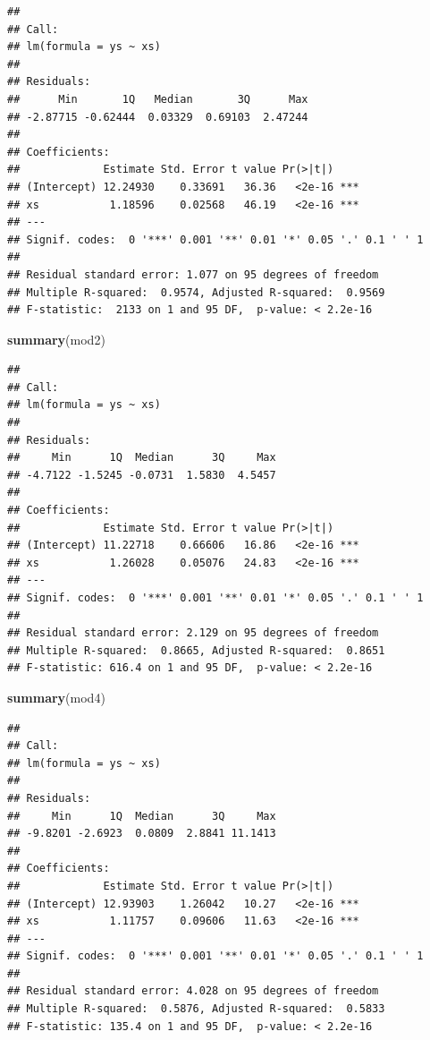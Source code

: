 \documentclass[
]{book}
\newenvironment{Shaded}{\begin{snugshade}}{\end{snugshade}}
\newcommand{\KeywordTok}[1]{\textcolor[rgb]{0.13,0.29,0.53}{\textbf{#1}}}
\newcommand{\NormalTok}[1]{#1}
\begin{document}
\begin{verbatim}
## 
## Call:
## lm(formula = ys ~ xs)
## 
## Residuals:
##      Min       1Q   Median       3Q      Max 
## -2.87715 -0.62444  0.03329  0.69103  2.47244 
## 
## Coefficients:
##             Estimate Std. Error t value Pr(>|t|)    
## (Intercept) 12.24930    0.33691   36.36   <2e-16 ***
## xs           1.18596    0.02568   46.19   <2e-16 ***
## ---
## Signif. codes:  0 '***' 0.001 '**' 0.01 '*' 0.05 '.' 0.1 ' ' 1
## 
## Residual standard error: 1.077 on 95 degrees of freedom
## Multiple R-squared:  0.9574,	Adjusted R-squared:  0.9569 
## F-statistic:  2133 on 1 and 95 DF,  p-value: < 2.2e-16
\end{verbatim}

\begin{Shaded}
\begin{Highlighting}[]
\KeywordTok{summary}\NormalTok{(mod2)}
\end{Highlighting}
\end{Shaded}

\begin{verbatim}
## 
## Call:
## lm(formula = ys ~ xs)
## 
## Residuals:
##     Min      1Q  Median      3Q     Max 
## -4.7122 -1.5245 -0.0731  1.5830  4.5457 
## 
## Coefficients:
##             Estimate Std. Error t value Pr(>|t|)    
## (Intercept) 11.22718    0.66606   16.86   <2e-16 ***
## xs           1.26028    0.05076   24.83   <2e-16 ***
## ---
## Signif. codes:  0 '***' 0.001 '**' 0.01 '*' 0.05 '.' 0.1 ' ' 1
## 
## Residual standard error: 2.129 on 95 degrees of freedom
## Multiple R-squared:  0.8665,	Adjusted R-squared:  0.8651 
## F-statistic: 616.4 on 1 and 95 DF,  p-value: < 2.2e-16
\end{verbatim}

\begin{Shaded}
\begin{Highlighting}[]
\KeywordTok{summary}\NormalTok{(mod4)}
\end{Highlighting}
\end{Shaded}

\begin{verbatim}
## 
## Call:
## lm(formula = ys ~ xs)
## 
## Residuals:
##     Min      1Q  Median      3Q     Max 
## -9.8201 -2.6923  0.0809  2.8841 11.1413 
## 
## Coefficients:
##             Estimate Std. Error t value Pr(>|t|)    
## (Intercept) 12.93903    1.26042   10.27   <2e-16 ***
## xs           1.11757    0.09606   11.63   <2e-16 ***
## ---
## Signif. codes:  0 '***' 0.001 '**' 0.01 '*' 0.05 '.' 0.1 ' ' 1
## 
## Residual standard error: 4.028 on 95 degrees of freedom
## Multiple R-squared:  0.5876,	Adjusted R-squared:  0.5833 
## F-statistic: 135.4 on 1 and 95 DF,  p-value: < 2.2e-16
\end{verbatim}
\end{document}
